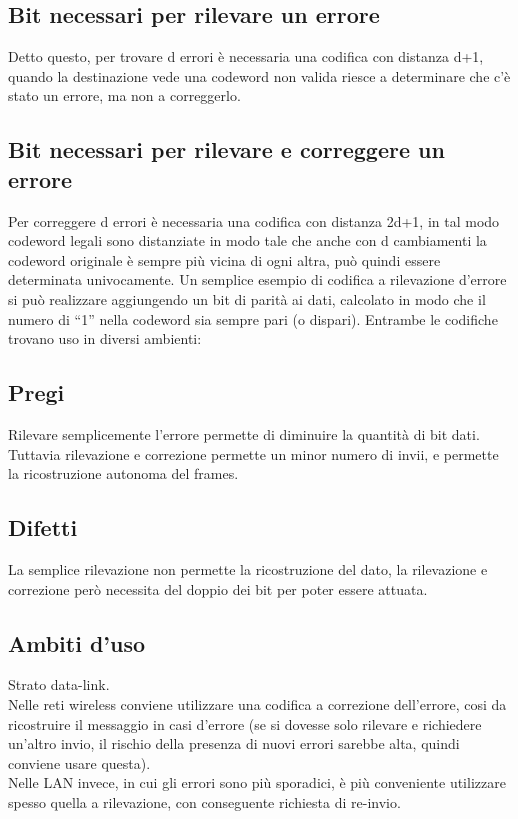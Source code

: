 \subsection{Bit necessari per rilevare un errore}
Detto questo, per trovare d errori è necessaria una codifica con distanza d+1, quando la destinazione vede una codeword non valida riesce a determinare che c'è stato un errore, ma non a correggerlo.
\subsection{Bit necessari per rilevare e correggere un errore}
Per correggere d errori è necessaria una codifica con distanza 2d+1, in tal modo codeword legali sono distanziate in modo tale che anche con d cambiamenti la codeword originale è sempre più vicina di ogni altra, può quindi essere determinata univocamente.
Un semplice esempio di codifica a rilevazione d'errore si può realizzare aggiungendo un bit di parità ai dati, calcolato in modo che il numero di “1” nella codeword sia sempre pari (o dispari).
Entrambe le codifiche trovano uso in diversi ambienti:


\subsection{Pregi}
Rilevare semplicemente l'errore permette di diminuire la quantità di bit dati.
Tuttavia rilevazione e correzione permette un minor numero di invii, e permette la ricostruzione autonoma del frames.

\subsection{Difetti}
La semplice rilevazione non permette la ricostruzione del dato, la rilevazione e correzione però necessita del doppio dei bit per poter essere attuata.

\subsection{Ambiti d'uso}
Strato data-link.\\
Nelle reti wireless conviene utilizzare una codifica a correzione dell'errore, cosi da ricostruire il messaggio in casi d'errore (se si dovesse solo rilevare e richiedere un'altro invio, il rischio della presenza di nuovi errori sarebbe alta, quindi conviene usare questa).\\
Nelle LAN invece, in cui gli errori sono più sporadici, è più conveniente utilizzare spesso quella a rilevazione, con conseguente richiesta di re-invio.


